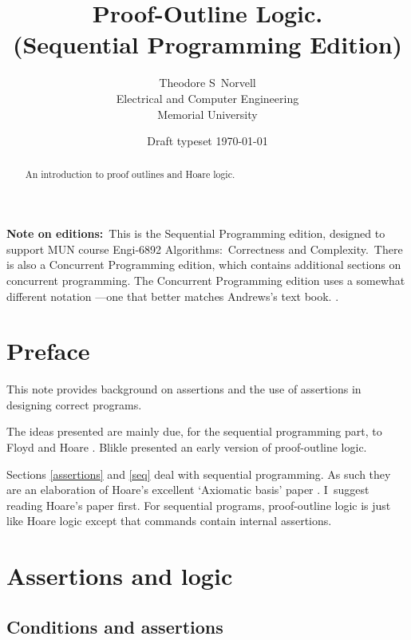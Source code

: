 \documentclass[muchmore,11pt]{article}%
\begin{document}
\title{Proof-Outline Logic.\\(Sequential Programming Edition)}
\author{Theodore S\ Norvell\\Electrical and Computer Engineering\\Memorial University}
\date{Draft typeset
\today
}
\maketitle

\begin{abstract}
An introduction to proof outlines and Hoare logic.

\end{abstract}

\textbf{Note on editions:}\ This is the Sequential Programming edition,
designed to support MUN course Engi-6892 Algorithms:\ Correctness and
Complexity.\ There is also a Concurrent Programming edition, which contains
additional sections on concurrent programming. The Concurrent Programming
edition uses a somewhat different notation ---one that better matches Andrews's
text book. \cite{Andrews2000}.

\section{Preface}

This note provides background on assertions and the use of assertions in
designing correct programs.

The ideas presented are mainly due, for the sequential programming part, to
Floyd \cite{Floyd670} and Hoare \cite{Hoare690}. Blikle \cite{Blikle1979}
presented an early version of proof-outline logic.

Sections \ref{assertions} and \ref{seq} deal with sequential programming. As
such they are an elaboration of Hoare's excellent `Axiomatic basis' paper
\cite{Hoare690}. I\ suggest reading Hoare's paper first. For sequential
programs, proof-outline logic is just like Hoare logic except that commands
contain internal assertions.

\section{Assertions and logic\label{assertions}}

\subsection{Conditions and assertions}
\end{document}
